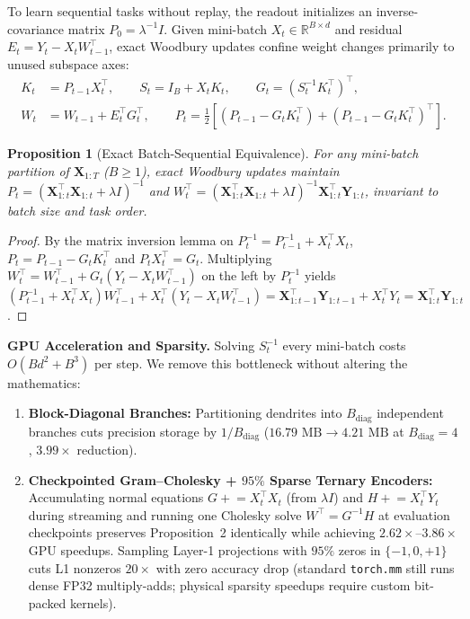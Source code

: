 \documentclass[11pt,a4paper]{article}
\newtheorem{proposition}{Proposition}
\begin{document}
To learn sequential tasks without replay, the readout initializes an inverse-covariance matrix $P_0 = \lambda^{-1} I$. Given mini-batch $X_t \in \mathbb{R}^{B \times d}$ and residual $E_t = Y_t - X_t W_{t-1}^\top$, exact Woodbury updates confine weight changes primarily to unused subspace axes:
\begin{align}
K_t &= P_{t-1} X_t^\top, \qquad S_t = I_B + X_t K_t, \qquad G_t = (S_t^{-1} K_t^\top)^\top, \\
W_t &= W_{t-1} + E_t^\top G_t^\top, \qquad P_t = \tfrac{1}{2}\!\left[(P_{t-1} - G_t K_t^\top) + (P_{t-1} - G_t K_t^\top)^\top\right].
\end{align}

\begin{proposition}[Exact Batch-Sequential Equivalence]
For any mini-batch partition of $\mathbf{X}_{1:T}$ ($B \ge 1$), exact Woodbury updates maintain $P_t = (\mathbf{X}_{1:t}^\top\mathbf{X}_{1:t} + \lambda I)^{-1}$ and $W_t^\top = (\mathbf{X}_{1:t}^\top\mathbf{X}_{1:t} + \lambda I)^{-1}\mathbf{X}_{1:t}^\top \mathbf{Y}_{1:t}$, invariant to batch size and task order.
\end{proposition}
\begin{proof}
By the matrix inversion lemma on $P_t^{-1} = P_{t-1}^{-1} + X_t^\top X_t$, $P_t = P_{t-1} - G_t K_t^\top$ and $P_t X_t^\top = G_t$. Multiplying $W_t^\top = W_{t-1}^\top + G_t(Y_t - X_t W_{t-1}^\top)$ on the left by $P_t^{-1}$ yields $(P_{t-1}^{-1} + X_t^\top X_t)W_{t-1}^\top + X_t^\top(Y_t - X_t W_{t-1}^\top) = \mathbf{X}_{1:t-1}^\top\mathbf{Y}_{1:t-1} + X_t^\top Y_t = \mathbf{X}_{1:t}^\top\mathbf{Y}_{1:t}$.
\end{proof}

\textbf{GPU Acceleration and Sparsity.} Solving $S_t^{-1}$ every mini-batch costs $O(B d^2 + B^3)$ per step. We remove this bottleneck without altering the mathematics:
\begin{enumerate}
    \item \textbf{Block-Diagonal Branches:} Partitioning dendrites into $B_{\text{diag}}$ independent branches cuts precision storage by $1/B_{\text{diag}}$ ($16.79\text{ MB} \to 4.21\text{ MB}$ at $B_{\text{diag}}=4$, $3.99\times$ reduction).
    \item \textbf{Checkpointed Gram--Cholesky + $95\%$ Sparse Ternary Encoders:} Accumulating normal equations $G \mathrel{+}= X_t^\top X_t$ (from $\lambda I$) and $H \mathrel{+}= X_t^\top Y_t$ during streaming and running one Cholesky solve $W^\top = G^{-1}H$ at evaluation checkpoints preserves Proposition~2 identically while achieving $2.62\times\text{--}3.86\times$ GPU speedups. Sampling Layer-1 projections with $95\%$ zeros in $\{-1, 0, +1\}$ cuts L1 nonzeros $20\times$ with zero accuracy drop (standard \texttt{torch.mm} still runs dense FP32 multiply-adds; physical sparsity speedups require custom bit-packed kernels).
\end{enumerate}
\end{document}
